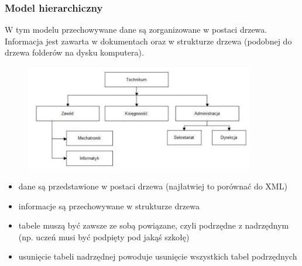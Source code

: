 \documentclass[a4paper,12pt,oneside]{book}
\begin{document}
			\subsubsection{Model hierarchiczny}
			W tym modelu przechowywane dane są zorganizowane w postaci drzewa. Informacja jest zawarta w dokumentach oraz w strukturze drzewa (podobnej do drzewa folderów na dysku komputera).
			\begin{figure}[h]
				\includegraphics[width=10cm]{modelhierarchiczny}
				\centering
			\end{figure}
			\begin{itemize}
				\itemsep 0em
				\item dane są przedstawione w postaci drzewa (najłatwiej to porównać do XML)
				\item informacje są przechowywane w strukturze drzewa
				\item tabele muszą być zawsze ze sobą powiązane, czyli podrzędne z nadrzędnym (np.
				uczeń musi być podpięty pod jakąś szkołę)
				\item usunięcie tabeli nadrzędnej powoduje usunięcie wszystkich tabel podrzędnych
			\end{itemize}
\end{document}

